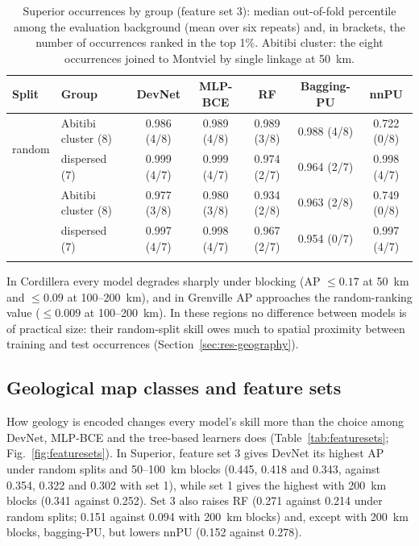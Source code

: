 \documentclass[pdflatex,sn-apa]{sn-jnl}
\begin{document}
\begin{table}[t]
\caption{Superior occurrences by group (feature set 3): median out-of-fold percentile among the evaluation background (mean over six repeats) and, in brackets, the number of occurrences ranked in the top 1\%. Abitibi cluster: the eight occurrences joined to Montviel by single linkage at 50~km.}\label{tab:occurrence}
\scriptsize
\setlength{\tabcolsep}{2.5pt}
\begin{tabular*}{\textwidth}{@{\extracolsep\fill}llccccc}
\toprule
Split & Group & DevNet & MLP-BCE & RF & Bagging-PU & nnPU \\
\midrule
\multirow{2}{*}{random} & Abitibi cluster (8) & 0.986 (4/8) & 0.989 (4/8) & 0.989 (3/8) & 0.988 (4/8) & 0.722 (0/8) \\
 & dispersed (7) & 0.999 (4/7) & 0.999 (4/7) & 0.974 (2/7) & 0.964 (2/7) & 0.998 (4/7) \\
\addlinespace
\multirow{2}{*}{100 km} & Abitibi cluster (8) & 0.977 (3/8) & 0.980 (3/8) & 0.934 (2/8) & 0.963 (2/8) & 0.749 (0/8) \\
 & dispersed (7) & 0.997 (4/7) & 0.998 (4/7) & 0.967 (2/7) & 0.954 (0/7) & 0.997 (4/7) \\
\botrule
\end{tabular*}
\end{table}

In Cordillera every model degrades sharply under blocking (AP $\leq 0.17$ at 50~km and $\leq 0.09$ at 100--200~km), and in Grenville AP approaches the random-ranking value ($\leq 0.009$ at 100--200~km). In these regions no difference between models is of practical size: their random-split skill owes much to spatial proximity between training and test occurrences (Section~\ref{sec:res-geography}).

\subsection{Geological map classes and feature sets}\label{sec:res-featuresets}

How geology is encoded changes every model's skill more than the choice among DevNet, MLP-BCE and the tree-based learners does (Table~\ref{tab:featuresets}; Fig.~\ref{fig:featuresets}). In Superior, feature set 3 gives DevNet its highest AP under random splits and 50--100~km blocks (0.445, 0.418 and 0.343, against 0.354, 0.322 and 0.302 with set 1), while set 1 gives the highest with 200~km blocks (0.341 against 0.252). Set 3 also raises RF (0.271 against 0.214 under random splits; 0.151 against 0.094 with 200~km blocks) and, except with 200~km blocks, bagging-PU, but lowers nnPU (0.152 against 0.278).
\end{document}
